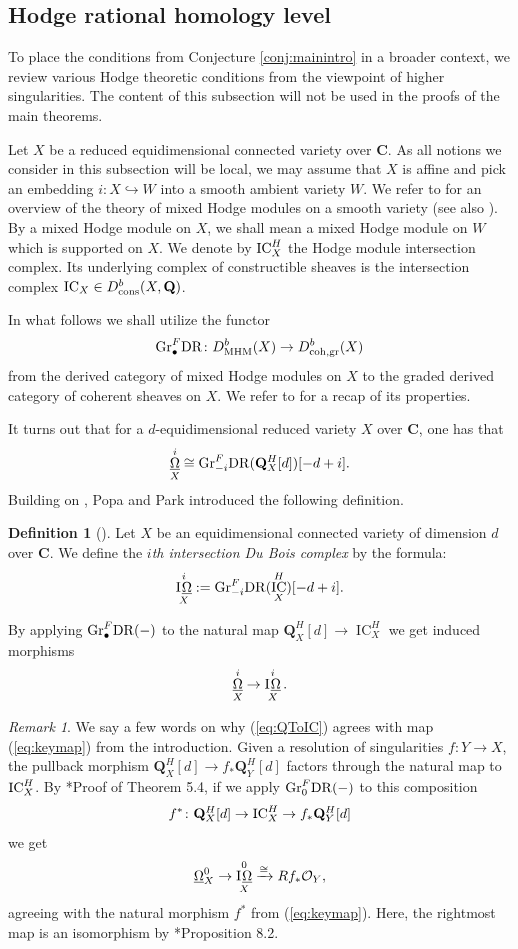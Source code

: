 \documentclass[letterpaper,11pt]{amsart}
\DeclareMathOperator{\DDB}{\underline{\Omega}}
\DeclareMathOperator{\IO}{I\hspace{0.07em}\underline{\Omega}}
\DeclareMathOperator{\IC}{IC}
\theoremstyle{plain}
\theoremstyle{definition}
\newtheorem{defi}[thm]{Definition}
\theoremstyle{remark}
\newtheorem{rmk}[thm]{Remark}
\def\Q{{\mathbf Q}}
\def\C{{\mathbf C}}
\def\cO{\mathcal{O}}
\begin{document}
\subsection{Hodge rational homology level} \label{ss:HRHl}
To place the conditions from Conjecture \ref{conj:mainintro} in a broader context, we review various Hodge theoretic conditions from the viewpoint of higher singularities. The content of this subsection will not be used in the proofs of the main theorems.

Let $X$ be a reduced equidimensional connected variety over $\C$. As all notions we consider in this subsection will be local, we may assume that $X$ is affine and pick an embedding $i \colon X \hookrightarrow W$ into a smooth ambient variety $W$. We refer to \cite{SchnellMHM} for an overview of the theory of mixed Hodge modules on a smooth variety (see also \cite[Section 2.4]{KW}). By a mixed Hodge module on $X$, we shall mean a mixed Hodge module on $W$ which is supported on $X$. We denote by ${\rm IC}^H_X$ the Hodge module intersection complex. Its underlying complex of constructible sheaves is the intersection complex ${\rm IC}_X \in D^b_{\rm cons}(X, \Q)$.

In what follows we shall utilize the functor
\[
{\rm Gr}^F_\bullet {\rm DR} \colon D^b_{\rm MHM}(X) \to D^b_{\rm coh, gr}(X)
\]
from the derived category of mixed Hodge modules on $X$ to the graded derived category of coherent sheaves on $X$. We refer to \cite[Proposition 2.17]{KW} for a recap of its properties.

It turns out that for a $d$-equidimensional reduced variety $X$ over $\C$, one has that 
\[
\DDB^i_X \cong {\rm Gr}^F_{-i} {\rm DR}(\Q^H_X[d])[-d+i].
\]
Building on \cite{KebekusSchnell}, Popa and Park introduced the following definition.
\begin{defi}[{\cite[Definition 3.3]{PPLefschetz}}]
  Let $X$ be an equidimensional connected variety of dimension $d$ over $\C$. We define the \emph{$i$th intersection Du Bois complex} by the formula:
  \[
  \IO^i_X := {\rm Gr}^F_{-i}{\rm DR}(\IC^H_X)[-d+i].
  \]
\end{defi}
By applying ${\rm Gr}^F_{\bullet}{\rm DR}(-)$ to the natural map $\Q^H_X[d] \to \IC^H_X$ we get induced morphisms
\begin{equation} \label{eq:QToIC}
\DDB^i_X \to \IO^i_X.
\end{equation}
\begin{rmk}

We say a few words on why (\ref{eq:QToIC}) agrees with map (\ref{eq:keymap}) from the introduction. Given a resolution of singularities $f\colon Y \to X$, the pullback morphism $\Q_X^H[d] \to f_* \Q_Y^H[d]$ factors through the natural map to ${\rm IC}_X^H$. By \cite{SaitoMHC}*{Proof of Theorem 5.4}, if we apply ${\rm Gr}^F_0 {\rm DR}(-)$ to this composition
\[
f^* \colon \Q_X^H[d] \to {\rm IC}_X^H \to f_* \Q_Y^H[d]
\]
we get
\[ \underline{\Omega}_X^0 \to \IO^0_X \xrightarrow{\cong} Rf_*\cO_Y,\]
agreeing with the natural morphism $f^*$ from (\ref{eq:keymap}). Here, the rightmost map is an isomorphism by \cite{KebekusSchnell}*{Proposition 8.2}.
\end{rmk}
\end{document}
